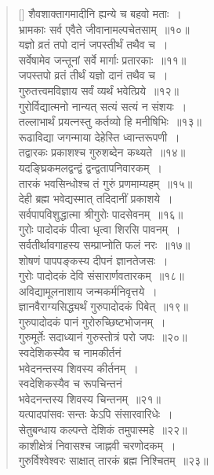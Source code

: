 \documentclass[twoside,12pt,notitlepage]{book}
\begin{document}
\begin{verse}[\versewidth]
शैवशाक्तागमादीनि ह्यन्ये च बहवो मताः~।\\[-6pt]
भ्रामकाः सर्व एवैते जीवानामल्पचेतसाम्~॥१०॥\\
यज्ञो व्रतं तपो दानं जपस्तीर्थं तथैव च~।\\[-6pt]
सर्वेषामेव जन्तूनां सर्वे मार्गाः प्रतारकाः~॥११॥\\
जपस्तपो व्रतं तीर्थं यज्ञो दानं तथैव च~।\\[-6pt]
गुरुतत्त्वमविज्ञाय सर्वं व्यर्थं भवेत्प्रिये~॥१२॥\\
गुरोर्विद्यात्मनो नान्यत् सत्यं सत्यं न संशयः~।\\[-6pt]
तल्लाभार्थं प्रयत्नस्तु कर्तव्यो हि मनीषिभिः~॥१३॥\\
रूढाविद्या जगन्माया देहेस्ति ध्वान्तरूपणी~।\\[-6pt]
तद्वारकः प्रकाशश्च गुरुशब्देन कथ्यते~॥१४॥\\
यदङ्घ्रिकमलद्वन्द्वं द्वन्द्वतापनिवारकम्~।\\[-6pt]
तारकं भवसिन्धोश्च तं गुरुं प्रणमाम्यहम्~॥१५॥\\
देही ब्रह्म भवेद्यस्मात् तदिदानीं प्रकाशये~।\\[-6pt]
सर्वपापविशुद्धात्मा श्रीगुरोः पादसेवनम्~॥१६॥\\
गुरोः पादोदकं पीत्वा धृत्वा शिरसि पावनम्~।\\[-6pt]
सर्वतीर्थावगाहस्य सम्प्राप्नोति फलं नरः~॥१७॥\\
शोषणं पापपङ्कस्य दीपनं ज्ञानतेजसः~।\\[-6pt]
गुरोः पादोदकं देवि संसारार्णवतारकम्~॥१८॥\\
अविद्यामूलनाशाय जन्मकर्मनिवृत्तये~।\\[-6pt]
ज्ञानवैराग्यसिद्ध्यर्थं गुरुपादोदकं पिबेत्~॥१९॥\\
गुरुपादोदकं पानं गुरोरुच्छिष्टभोजनम्~।\\[-6pt]
गुरुमूर्तेः सदाध्यानं गुरुस्तोत्रं परो जपः~॥२०॥\\
स्वदेशिकस्यैव च नामकीर्तनं\\[-6pt] भवेदनन्तस्य शिवस्य कीर्तनम्~।\\[-6pt]
स्वदेशिकस्यैव च रूपचिन्तनं\\[-6pt] भवेदनन्तस्य शिवस्य चिन्तनम्~॥२१॥\\
यत्पादपांसवः सन्तः केऽपि संसारवारिधेः~।\\[-6pt]
सेतुबन्धाय कल्पन्ते देशिकं तमुपास्महे~॥२२॥\\
काशीक्षेत्रं निवासश्च जाह्नवी चरणोदकम्~।\\[-6pt]
गुरुर्विश्वेश्वरः साक्षात् तारकं ब्रह्म निश्चितम्~॥२३॥\\

\end{verse}
\end{document}
